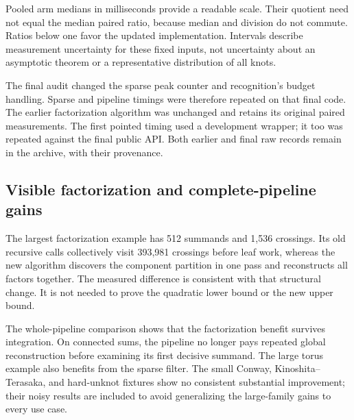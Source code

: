 Pooled arm medians in milliseconds provide a readable scale.  Their quotient
need not equal the median paired ratio, because median and division do not
commute.  Ratios below one favor the updated implementation.  Intervals
describe measurement uncertainty for these fixed inputs, not uncertainty
about an asymptotic theorem or a representative distribution of all knots.

The final audit changed the sparse peak counter and recognition's budget
handling.  Sparse and pipeline timings were therefore repeated on that final
code.  The earlier factorization algorithm was unchanged and retains its
original paired measurements.  The first pointed timing used a development
wrapper; it too was repeated against the final public API.  Both earlier
and final raw records remain in the archive, with their provenance.

\subsection{Visible factorization and complete-pipeline gains}

\begin{table}[htbp]
\centering\small

\caption{Checked factorization of the specified cyclic trefoil sums.
The input diagram is already constructed, but output factor validation
is timed.  This compares with the quadratic-work embedding proved in
Theorem~\ref{thm:quadratic-factor-family}.}
\label{tab:factor-times}
\end{table}

The largest factorization example has 512 summands and 1,536 crossings.
Its old recursive calls collectively visit 393,981 crossings before leaf
work, whereas the new algorithm discovers the component partition in one
pass and reconstructs all factors together.  The measured difference is
consistent with that structural change.  It is not needed to prove the
quadratic lower bound or the new upper bound.

\begin{table}[htbp]
\centering\small

\caption{Complete recognition with the updated defaults and the archived
defaults.  The pointed option is off in this comparison.}
\label{tab:pipeline-times}
\end{table}

The whole-pipeline comparison shows that the factorization benefit survives
integration.  On connected sums, the pipeline no longer pays repeated global
reconstruction before examining its first decisive summand.  The large torus
example also benefits from the sparse filter.  The small Conway,
Kinoshita--Terasaka, and hard-unknot fixtures show no consistent substantial
improvement; their noisy results are included to avoid generalizing the
large-family gains to every use case.

